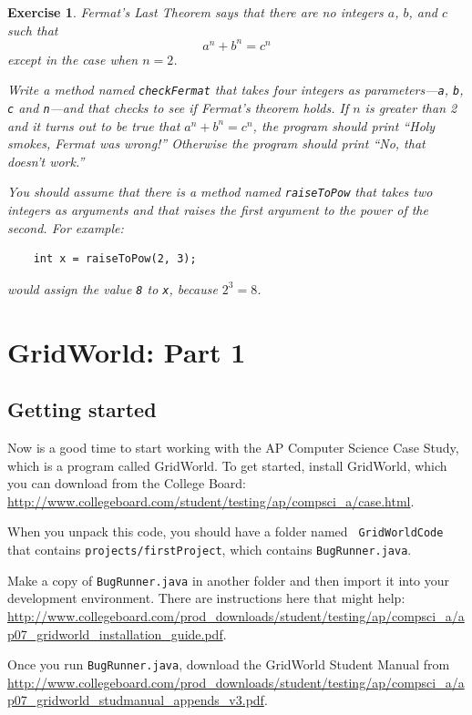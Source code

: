 \documentclass[12pt]{book}
\theoremstyle{exercise}
\newtheorem{exercise}{Exercise}[chapter]
\begin{document}
\begin{exercise}
Fermat's Last Theorem says that there are no integers
$a$, $b$, and $c$ such that
%
\[ a^n + b^n = c^n \]
%
except in the case when $n=2$.

Write a method named {\tt checkFermat} that takes four
integers as parameters---{\tt a}, {\tt b}, {\tt c} and {\tt n}---and
that checks to see if Fermat's theorem holds.  If
$n$ is greater than 2 and it turns out to be true that
$a^n + b^n = c^n$,
the program should print ``Holy smokes, Fermat was wrong!''
Otherwise the program should print ``No, that doesn't work.''

You should assume that there is a method named {\tt raiseToPow}
that takes two integers as arguments and that raises the
first argument to the power of the second.  For example:

\begin{lstlisting}
    int x = raiseToPow(2, 3);
\end{lstlisting}
%
would assign the value {\tt 8} to {\tt x}, because $2^3 = 8$.

\end{exercise}


\chapter{GridWorld: Part 1}
\label{gridworld}

\section{Getting started}

Now is a good time to start working with the AP Computer Science Case
Study, which is a program called GridWorld.  To get started, install
GridWorld, which you can download from the College Board:
\url{http://www.collegeboard.com/student/testing/ap/compsci_a/case.html}.

When you unpack this code, you should have a folder named {\tt
  GridWorldCode} that contains {\tt projects/firstProject}, which
contains {\tt BugRunner.java}.

Make a copy of {\tt BugRunner.java} in another folder and then import it
into your development environment.  There are instructions here that
might help: \url{http://www.collegeboard.com/prod_downloads/student/testing/ap/compsci_a/ap07_gridworld_installation_guide.pdf}.

Once you run {\tt BugRunner.java}, download the GridWorld Student
Manual from \url{http://www.collegeboard.com/prod_downloads/student/testing/ap/compsci_a/ap07_gridworld_studmanual_appends_v3.pdf}.
\end{document}
